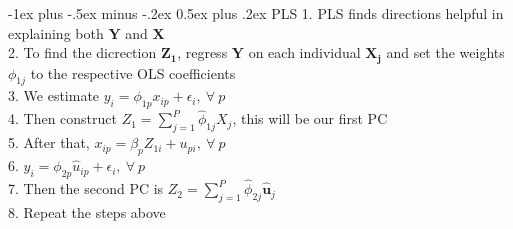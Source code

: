\documentclass[10pt,landscape]{article}
\makeatletter
\renewcommand{\section}{\@startsection{section}{1}{0mm}%
                                {-1ex plus -.5ex minus -.2ex}%
                                {0.5ex plus .2ex}%
                                {\normalfont\large\bfseries}}
\makeatother
\begin{document}
\begin{multicols}{4}
\section{PLS}
1. PLS finds directions helpful in explaining both $\boldsymbol{Y}$ and $\boldsymbol{X}$\\
2. To find the dicrection $\boldsymbol{Z_1}$, regress $\boldsymbol{Y}$ on each individual $\boldsymbol{X_j}$ and set the weights $\phi_{1j}$ to the respective OLS coefficients\\
3. We estimate $y_i = \phi_{1p}x_{ip} + \epsilon_i,\ \forall \ p$\\
4. Then construct $Z_1 = \sum_{j=1}^P \hat{\phi}_{1j}X_j$, this will be our first PC\\
5. After that, $x_{ip} = \beta_p Z_{1i} + u_{pi},\ \forall \ p$\\
6. $y_i = \phi_{2p}\hat{u}_{ip} + \epsilon_i,\ \forall \ p$\\
7. Then the second PC is $Z_2 = \sum_{j=1}^P \hat{\phi}_{2j}\boldsymbol{\hat{u}}_j$\\
8. Repeat the steps above\\


\end{multicols}
\end{document}
